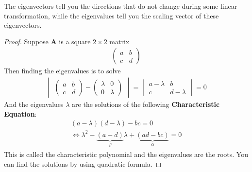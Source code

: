 \documentclass[11pt,a4paper]{book}
\theoremstyle{definition}\newtheorem{definition}{Definition}
\theoremstyle{definition}\newtheorem{fact}{Fact}
\theoremstyle{definition}\newtheorem{remark}{Remark}
\theoremstyle{definition}\newtheorem{ex}{Ex.}
\theoremstyle{definition}\newtheorem{project}{Project}
\theoremstyle{definition}\newtheorem{problem}{Problem}
\theoremstyle{definition}\newtheorem{example}{Example}
\numberwithin{theorem}{section}
\numberwithin{corollary}{chapter}
\numberwithin{assumption}{chapter}
\numberwithin{definition}{chapter}
\numberwithin{prop}{chapter}
\numberwithin{notation}{chapter}
\numberwithin{problem}{chapter}
\numberwithin{example}{chapter}
\numberwithin{fact}{chapter}
\numberwithin{ex}{chapter}
\def\A{\mathbf A}
\begin{document}
	The eigenvectors tell you the directions that do not change during some linear transformation, while the eigenvalues tell you the scaling vector of these eigenvectors. 
	
	\begin{proof}
		Suppose $\A$ is a square $2 \times 2$ matrix
		\begin{align*}
			\begin{pmatrix}
				a & b \\ c & d
			\end{pmatrix}
		\end{align*}
		Then finding the eigenvalues is to solve
		\begin{align*}
			\begin{vmatrix}
				\begin{pmatrix}
					a           & b \\ c & d
				\end{pmatrix} - 
				\begin{pmatrix}
					\lambda     & 0 \\ 0 & \lambda
				\end{pmatrix} 
			\end{vmatrix} = 
			\begin{vmatrix}
				a - \lambda & b \\ c & d-\lambda 
			\end{vmatrix} = 0
		\end{align*}
		And the eigenvalues $\lambda$ are the solutions of the following \textbf{Characteristic Equation}:
		\begin{align}
			(a-\lambda)(d-\lambda) - bc = 0 \nonumber \\
			\Leftrightarrow \lambda^2 - \underbrace{(a+d)}_{\beta} \lambda + \underbrace{(ad-bc)}_{\alpha} = 0 \label{eigen}
		\end{align}
		This is called the characteristic polynomial and the eigenvalues are the roots. You can find the solutions by using quadratic formula.
		

\end{proof}
\end{document}
